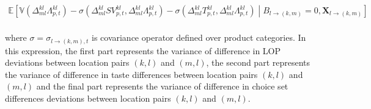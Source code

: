 \begin{linenomath*}
\begin{equation*}
\begin{aligned}
                        \mathbb{E}
                        \left[
                            \mathbb{V}\left(\Delta_{ml}^{kl}\Lambda_{p,t}^{kl}\right)
                                - \sigma\left(\Delta_{ml}^{kl}SV_{p,t}^{kl},\Delta_{ml}^{kl}\Lambda_{p,t}^{kl}\right)
                                - \sigma\left(\Delta_{ml}^{kl}T_{p,t}^{kl},\Delta_{ml}^{kl}\Lambda_{p,t}^{kl}\right)
                            \middle\vert  B_{l \rightarrow (k,m)} = 0, \boldsymbol{X}_{l \rightarrow (k,m)}
                        \right] \\
        \end{aligned}
    \end{equation*}
\end{linenomath*}
where $\sigma = \sigma_{l \rightarrow (k,m),t}$ is covariance operator defined over product categories. In this expression, the first part represents the variance of difference in LOP deviations between location pairs $(k,l)$ and $(m,l)$, the second part represents the variance of difference in taste differences between location pairs $(k,l)$ and $(m,l)$ and the final part represents the variance of difference in choice set differences deviations between location pairs $(k,l)$ and $(m,l)$. \\

